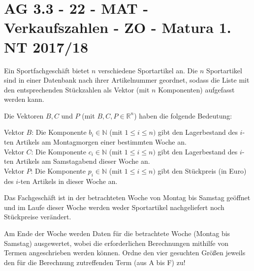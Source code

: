 \section{AG 3.3 - 22 - MAT - Verkaufszahlen - ZO - Matura 1. NT 2017/18}

\begin{beispiel}[AG 3.3]{1}
Ein Sportfachgeschäft bietet $n$ verschiedene Sportartikel an. Die $n$ Sportartikel sind in einer Datenbank nach ihrer Artikelnummer geordnet, sodass die Liste mit den entsprechenden Stückzahlen als Vektor (mit $n$ Komponenten) aufgefasst werden kann.

Die Vektoren $B, C$ und $P$ (mit $B, C, P\in\mathbb{R}^n$) haben die folgende Bedeutung:

Vektor $B$: Die Komponente $b_i\in\mathbb{N}$ (mit $1\leq i\leq n)$ gibt den Lagerbestand des $i$-ten Artikels am Montagmorgen einer bestimmten Woche an.\\
Vektor $C$: Die Komponente $c_i\in\mathbb{N}$ (mit $1\leq i\leq n)$ gibt den Lagerbestand des $i$-ten Artikels am Samstagabend dieser Woche an.\\
Vektor $P$: Die Komponente $p_i\in\mathbb{N}$ (mit $1\leq i\leq n)$ gibt den Stückpreis (in Euro) des $i$-ten Artikels in dieser Woche an.

Das Fachgeschäft ist in der betrachteten Woche von Montag bis Samstag geöffnet und im Laufe dieser Woche werden weder Sportartikel nachgeliefert noch Stückpreise verändert.

Am Ende der Woche werden Daten für die betrachtete Woche (Montag bis Samstag) ausgewertet, wobei die erforderlichen Berechnungen mithilfe von Termen angeschrieben werden können. Ordne den vier gesuchten Größen jeweils den für die Berechnung zutreffenden Term (aus A bis F) zu!

\end{beispiel}